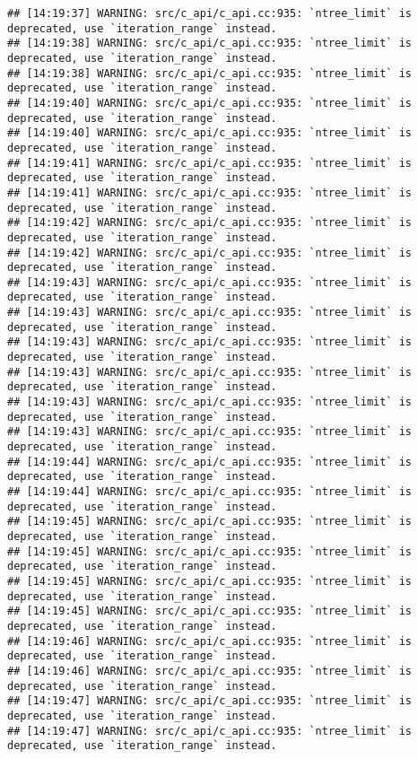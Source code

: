 \documentclass[
]{article}
\begin{document}
\begin{verbatim}
## [14:19:37] WARNING: src/c_api/c_api.cc:935: `ntree_limit` is deprecated, use `iteration_range` instead.
## [14:19:38] WARNING: src/c_api/c_api.cc:935: `ntree_limit` is deprecated, use `iteration_range` instead.
## [14:19:38] WARNING: src/c_api/c_api.cc:935: `ntree_limit` is deprecated, use `iteration_range` instead.
## [14:19:40] WARNING: src/c_api/c_api.cc:935: `ntree_limit` is deprecated, use `iteration_range` instead.
## [14:19:40] WARNING: src/c_api/c_api.cc:935: `ntree_limit` is deprecated, use `iteration_range` instead.
## [14:19:41] WARNING: src/c_api/c_api.cc:935: `ntree_limit` is deprecated, use `iteration_range` instead.
## [14:19:41] WARNING: src/c_api/c_api.cc:935: `ntree_limit` is deprecated, use `iteration_range` instead.
## [14:19:42] WARNING: src/c_api/c_api.cc:935: `ntree_limit` is deprecated, use `iteration_range` instead.
## [14:19:42] WARNING: src/c_api/c_api.cc:935: `ntree_limit` is deprecated, use `iteration_range` instead.
## [14:19:43] WARNING: src/c_api/c_api.cc:935: `ntree_limit` is deprecated, use `iteration_range` instead.
## [14:19:43] WARNING: src/c_api/c_api.cc:935: `ntree_limit` is deprecated, use `iteration_range` instead.
## [14:19:43] WARNING: src/c_api/c_api.cc:935: `ntree_limit` is deprecated, use `iteration_range` instead.
## [14:19:43] WARNING: src/c_api/c_api.cc:935: `ntree_limit` is deprecated, use `iteration_range` instead.
## [14:19:43] WARNING: src/c_api/c_api.cc:935: `ntree_limit` is deprecated, use `iteration_range` instead.
## [14:19:43] WARNING: src/c_api/c_api.cc:935: `ntree_limit` is deprecated, use `iteration_range` instead.
## [14:19:44] WARNING: src/c_api/c_api.cc:935: `ntree_limit` is deprecated, use `iteration_range` instead.
## [14:19:44] WARNING: src/c_api/c_api.cc:935: `ntree_limit` is deprecated, use `iteration_range` instead.
## [14:19:45] WARNING: src/c_api/c_api.cc:935: `ntree_limit` is deprecated, use `iteration_range` instead.
## [14:19:45] WARNING: src/c_api/c_api.cc:935: `ntree_limit` is deprecated, use `iteration_range` instead.
## [14:19:45] WARNING: src/c_api/c_api.cc:935: `ntree_limit` is deprecated, use `iteration_range` instead.
## [14:19:45] WARNING: src/c_api/c_api.cc:935: `ntree_limit` is deprecated, use `iteration_range` instead.
## [14:19:46] WARNING: src/c_api/c_api.cc:935: `ntree_limit` is deprecated, use `iteration_range` instead.
## [14:19:46] WARNING: src/c_api/c_api.cc:935: `ntree_limit` is deprecated, use `iteration_range` instead.
## [14:19:47] WARNING: src/c_api/c_api.cc:935: `ntree_limit` is deprecated, use `iteration_range` instead.
## [14:19:47] WARNING: src/c_api/c_api.cc:935: `ntree_limit` is deprecated, use `iteration_range` instead.

\end{verbatim}
\end{document}
